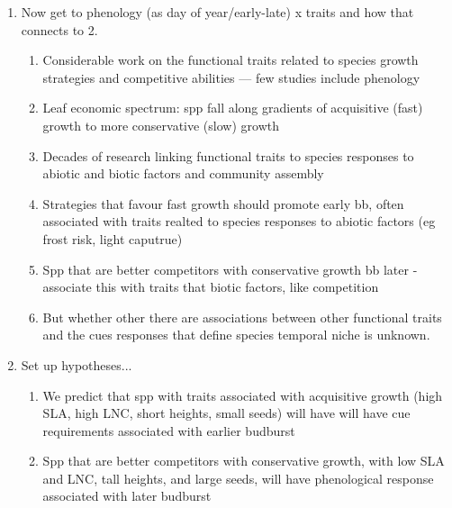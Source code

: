 \documentclass{article}
\begin{document}
\begin{enumerate}
\item Now get to phenology (as day of year/early-late) x traits and how that connects to 2.
\begin{enumerate}
\item Considerable work on the functional traits related to species growth strategies and competitive abilities — few studies include phenology
\item Leaf economic spectrum: spp fall along gradients of acquisitive (fast) growth to more conservative (slow) growth %
\item Decades of research linking functional traits to species responses to abiotic and biotic factors and community assembly
\item Strategies that favour fast growth should promote early bb, often associated with traits realted to species responses to abiotic factors (eg frost risk, light caputrue)
\item Spp that are better competitors with conservative growth bb later - associate this with traits that biotic factors, like competition
\item But whether other there are associations between other functional traits and the cues responses that define species temporal niche is unknown.
\end{enumerate}

\item Set up hypotheses...
\begin{enumerate}
\item We predict that spp with traits associated with acquisitive growth (high SLA, high LNC, short heights, small seeds) will have will have cue requirements associated with earlier budburst %
\item Spp that are better competitors with conservative growth, with low SLA and LNC, tall heights, and large seeds, will have phenological response associated with later budburst %
\end{enumerate}


\end{enumerate}
\end{document}
